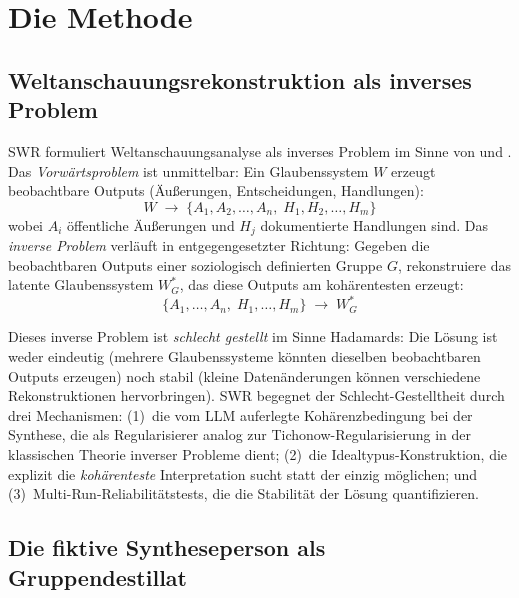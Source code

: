 \documentclass[11pt,a4paper]{article}
\begin{document}
\section{Die Methode}
\label{sec:method}

\subsection{Weltanschauungsrekonstruktion als inverses Problem}
\label{sec:method:inverse}

SWR formuliert Weltanschauungsanalyse als inverses Problem im Sinne von \citet{Hadamard1923} und \citet{Tarantola2005}. Das \emph{Vorw\"artsproblem} ist unmittelbar: Ein Glaubenssystem $W$ erzeugt beobachtbare Outputs (\"Au\ss{}erungen, Entscheidungen, Handlungen):
\begin{equation}
  W \;\longrightarrow\; \{A_1, A_2, \ldots, A_n,\; H_1, H_2, \ldots, H_m\}
  \label{eq:forward}
\end{equation}
wobei $A_i$ \"offentliche \"Au\ss{}erungen und $H_j$ dokumentierte Handlungen sind. Das \emph{inverse Problem} verl\"auft in entgegengesetzter Richtung: Gegeben die beobachtbaren Outputs einer soziologisch definierten Gruppe $G$, rekonstruiere das latente Glaubenssystem $W_G^*$, das diese Outputs am koh\"arentesten erzeugt:
\begin{equation}
  \{A_1, \ldots, A_n,\; H_1, \ldots, H_m\} \;\longrightarrow\; W_G^*
  \label{eq:inverse}
\end{equation}

Dieses inverse Problem ist \emph{schlecht gestellt} im Sinne Hadamards: Die L\"osung ist weder eindeutig (mehrere Glaubenssysteme k\"onnten dieselben beobachtbaren Outputs erzeugen) noch stabil (kleine Daten\"anderungen k\"onnen verschiedene Rekonstruktionen hervorbringen). SWR begegnet der Schlecht-Gestelltheit durch drei Mechanismen: (1)~die vom LLM auferlegte Koh\"arenzbedingung bei der Synthese, die als Regularisierer analog zur Tichonow-Regularisierung in der klassischen Theorie inverser Probleme dient; (2)~die Idealtypus-Konstruktion, die explizit die \emph{koh\"arenteste} Interpretation sucht statt der einzig m\"oglichen; und (3)~Multi-Run-Reliabilit\"atstests, die die Stabilit\"at der L\"osung quantifizieren.


\subsection{Die fiktive Syntheseperson als Gruppendestillat}
\label{sec:method:fiction}
\end{document}
